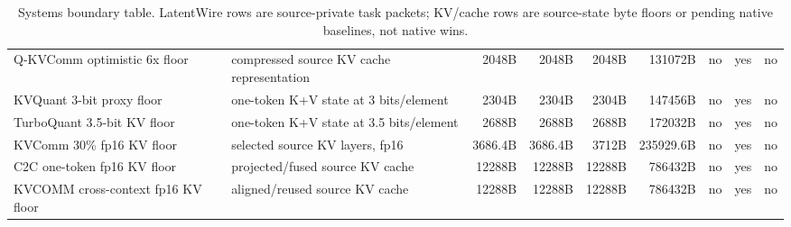 \begin{table}[t]
{\begin{tabular}{llrrrrrrr}
Q-KVComm optimistic 6x floor & compressed source KV cache representation & 2048B & 2048B & 2048B & 131072B & no & yes & no \\
KVQuant 3-bit proxy floor & one-token K+V state at 3 bits/element & 2304B & 2304B & 2304B & 147456B & no & yes & no \\
TurboQuant 3.5-bit KV floor & one-token K+V state at 3.5 bits/element & 2688B & 2688B & 2688B & 172032B & no & yes & no \\
KVComm 30\% fp16 KV floor & selected source KV layers, fp16 & 3686.4B & 3686.4B & 3712B & 235929.6B & no & yes & no \\
C2C one-token fp16 KV floor & projected/fused source KV cache & 12288B & 12288B & 12288B & 786432B & no & yes & no \\
KVCOMM cross-context fp16 KV floor & aligned/reused source KV cache & 12288B & 12288B & 12288B & 786432B & no & yes & no \\
\bottomrule
\end{tabular}%
}
\caption{Systems boundary table. LatentWire rows are source-private task packets; KV/cache rows are source-state byte floors or pending native baselines, not native wins.}
\label{tab:systems-boundary}
\end{table}
